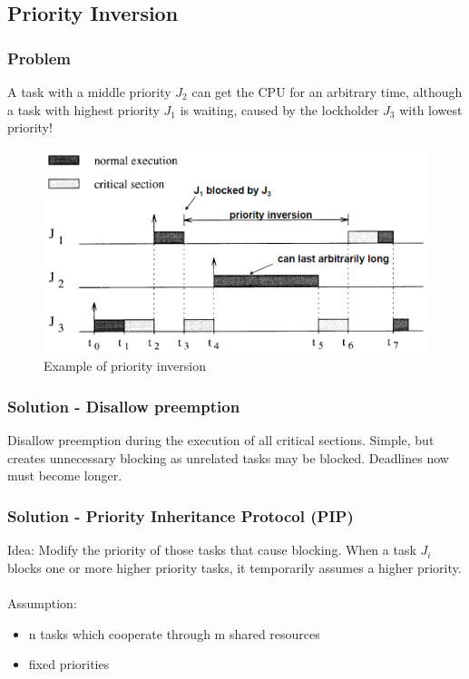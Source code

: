\subsection{Priority Inversion}

\subsubsection{Problem}
A task with a middle priority $J_2$ can get the CPU for an arbitrary time, although a task with highest priority $J_1$ is waiting, caused by the lockholder $J_3$ with lowest priority!

\begin{figure}[ht]
	\centering
  	\includegraphics[scale=0.35]{img/5_resource_priority_inversion_1.png}
	\caption{Example of priority inversion}
	\label{fig2}
\end{figure}


\subsubsection{Solution - Disallow preemption}
Disallow preemption during the execution of all critical
sections. Simple, but creates unnecessary blocking as
unrelated tasks may be blocked. Deadlines now must become longer.

\subsubsection{Solution - Priority Inheritance Protocol (PIP)}
Idea: Modify the priority of those tasks that cause
blocking. When a task $J_i$ blocks one or more higher priority
tasks, it temporarily assumes a higher priority.
\\\\
Assumption:
\begin{itemize}[noitemsep]
\item n tasks which cooperate through m shared resources
\item fixed priorities
\end{itemize}

